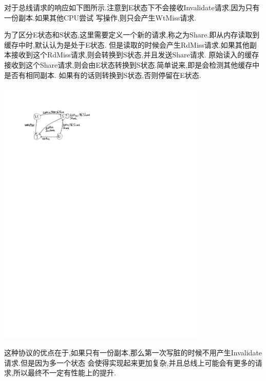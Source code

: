 \documentclass[adobefonts, nocap]{ctexart}
\begin{document}
    对于总线请求的响应如下图所示.注意到E状态下不会接收Invalidate请求,因为只有一份副本.如果其他CPU尝试
    写操作,则只会产生WtMiss请求.

    为了区分E状态和S状态,这里需要定义一个新的请求,称之为Share.即从内存读取到缓存中时,默认认为是处于E状态.
    但是读取的时候会产生RdMiss请求.如果其他副本接收到这个RdMiss请求,则会转换到S状态,并且发送Share请求.
    原始读入的缓存接收到这个Share请求,则会由E状态转换到S状态.简单说来,即是会检测其他缓存中是否有相同副本.
    如果有的话则转换到S状态,否则停留在E状态.

    \begin{center}
      \includegraphics[width=10cm]{4-crop.pdf}
    \end{center}

    这种协议的优点在于,如果只有一份副本,那么第一次写脏的时候不用产生Invalidate请求.但是因为多一个状态
    会使得实现起来更加复杂,并且总线上可能会有更多的请求,所以最终不一定有性能上的提升.
\end{document}
